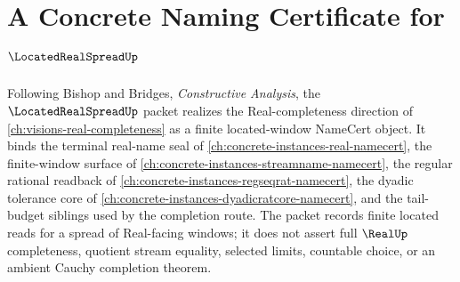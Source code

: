 \chapter{A Concrete Naming Certificate for $\LocatedRealSpreadUp$}
\label{ch:concrete-instances-located-real-spread-namecert}

Following Bishop and Bridges, \emph{Constructive Analysis}, the $\LocatedRealSpreadUp$ packet realizes the Real-completeness direction of \autoref{ch:visions-real-completeness} as a finite located-window NameCert object. It binds the terminal real-name seal of \autoref{ch:concrete-instances-real-namecert}, the finite-window surface of \autoref{ch:concrete-instances-streamname-namecert}, the regular rational readback of \autoref{ch:concrete-instances-regseqrat-namecert}, the dyadic tolerance core of \autoref{ch:concrete-instances-dyadicratcore-namecert}, and the tail-budget siblings used by the completion route. The packet records finite located reads for a spread of Real-facing windows; it does not assert full $\RealUp$ completeness, quotient stream equality, selected limits, countable choice, or an ambient Cauchy completion theorem.

